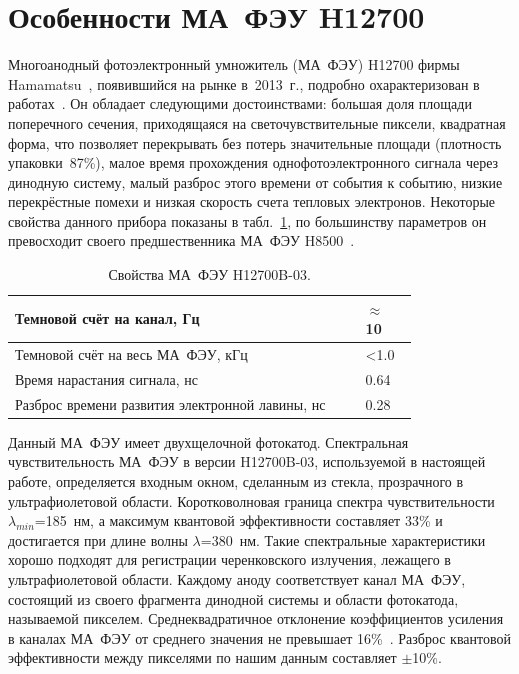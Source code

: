 \section{Особенности МА~ФЭУ H12700}\label{section:secMapmt}

Многоанодный фотоэлектронный умножитель (МА~ФЭУ) H12700 фирмы Hamamatsu~\cite{H12700MANUAL}, появившийся на рынке в~2013~г., подробно охарактеризован в работах~\cite{CALVI, CALVI2}. Он обладает следующими достоинствами: большая доля площади поперечного сечения, приходящаяся на светочувствительные пиксели, квадратная форма, что позволяет перекрывать без потерь значительные площади (плотность упаковки~87\%), малое время прохождения однофотоэлектронного сигнала через динодную систему, малый разброс этого времени от события к событию, низкие перекрёстные помехи и низкая скорость счета тепловых электронов. Некоторые свойства данного прибора показаны в табл.~\ref{tabl:MAPMT}, по большинству параметров он превосходит своего предшественника МА~ФЭУ H8500~\cite{H8500MANUAL}.

\begin{table}[H]
\caption{Свойства МА~ФЭУ H12700B-03.}
\label{tabl:MAPMT}


\begin{tabular}{ | p{0.7\linewidth} | p{0.1\linewidth} |}
	\hline
	Темновой счёт на канал, Гц & $ \approx $ 10 \\
	\hline
	Темновой счёт на весь МА~ФЭУ, кГц & <1.0 \\
	\hline
	Время нарастания сигнала, нс & 0.64 \\
	\hline
	Разброс времени развития электронной лавины, нс & 0.28 \\
	\hline
\end{tabular}

\end{table}

Данный МА~ФЭУ имеет двухщелочной фотокатод. Спектральная чувствительность МА~ФЭУ в версии H12700B-03, используемой в настоящей работе, определяется входным окном, сделанным из стекла, прозрачного в ультрафиолетовой области. Коротковолновая граница спектра чувствительности $ \lambda_{min} $=185~нм, а максимум квантовой эффективности составляет 33\% и достигается при длине волны $ \lambda $=380~нм. Такие спектральные характеристики хорошо подходят для регистрации черенковского излучения, лежащего в ультрафиолетовой области. Каждому аноду соответствует канал МА~ФЭУ, состоящий из своего фрагмента динодной системы и области фотокатода, называемой пикселем. Среднеквадратичное отклонение коэффициентов усиления в каналах МА~ФЭУ от среднего значения не превышает 16\%~\cite{H12700MANUAL}. Разброс квантовой эффективности между пикселями по нашим данным составляет $ \pm $10\%.

